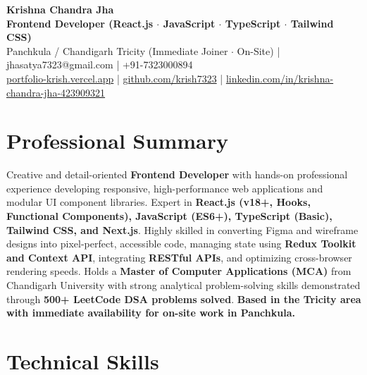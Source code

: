 \documentclass[a4paper,10pt]{article}
\begin{document}
\begin{center}

    {\LARGE \textbf{Krishna Chandra Jha}} \\[2.5pt]

    \textbf{Frontend Developer (React.js $\cdot$ JavaScript $\cdot$ TypeScript $\cdot$ Tailwind CSS)} \\[3.5pt]

    Panchkula / Chandigarh Tricity (Immediate Joiner $\cdot$ On-Site)
    \quad | \quad
    jhasatya7323@gmail.com
    \quad | \quad
    +91-7323000894
    \\[2.5pt]

    \href{https://portfolio-ashen-alpha-dv0whhsamo.vercel.app/}{portfolio-krish.vercel.app}
    \quad | \quad
    \href{https://github.com/krish7323}{github.com/krish7323}
    \quad | \quad
    \href{https://linkedin.com/in/krishna-chandra-jha-423909321}
    {linkedin.com/in/krishna-chandra-jha-423909321}

\end{center}

\section*{Professional Summary}

Creative and detail-oriented \textbf{Frontend Developer} with hands-on professional experience developing responsive, high-performance web applications and modular UI component libraries. Expert in \textbf{React.js (v18+, Hooks, Functional Components), JavaScript (ES6+), TypeScript (Basic), Tailwind CSS, and Next.js}. Highly skilled in converting Figma and wireframe designs into pixel-perfect, accessible code, managing state using \textbf{Redux Toolkit and Context API}, integrating \textbf{RESTful APIs}, and optimizing cross-browser rendering speeds. Holds a \textbf{Master of Computer Applications (MCA)} from Chandigarh University with strong analytical problem-solving skills demonstrated through \textbf{500+ LeetCode DSA problems solved}. \textbf{Based in the Tricity area with immediate availability for on-site work in Panchkula.}

\section*{Technical Skills}
\end{document}
